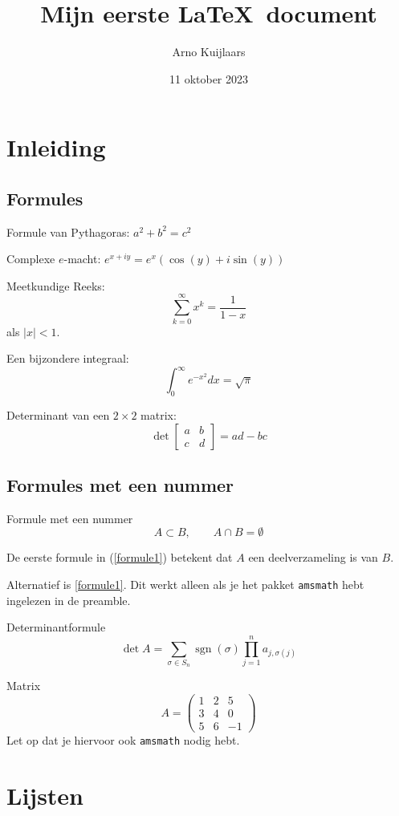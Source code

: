\documentclass[12pt,a4paper]{article}
\title{Mijn eerste \LaTeX\ document}
\author{Arno Kuijlaars}
\date{11 oktober 2023}
\DeclareMathOperator{\sgn}{sgn}
\begin{document}
\maketitle

\section{Inleiding}
\subsection{Formules}

Formule van Pythagoras:  $a^2 + b^2 = c^2$

Complexe $e$-macht: $e^{x+iy} =  e^x (\cos(y) + i \sin(y))$

Meetkundige Reeks:
\[ \sum_{k=0}^{\infty} x^k =  \frac{1}{1-x} \]
 als $|x| < 1$.

 Een bijzondere integraal:
  \[ \int_0^{\infty} e^{-x^2} dx = \sqrt{\pi} \]
  

Determinant van een $2 \times 2$ matrix:
\[ \det \begin{bmatrix} a & b \\ c & d \end{bmatrix} =  ad - bc \]

\subsection{Formules met een nummer}
Formule met een nummer
\begin{equation} \label{formule1}
	   A \subset B,  \qquad A \cap B = \emptyset
\end{equation}

De eerste formule in (\ref{formule1}) 
betekent dat $A$ een deelverzameling  is van $B$.

Alternatief is \eqref{formule1}. Dit werkt alleen als je
het pakket \verb|amsmath| hebt ingelezen in de preamble.

Determinantformule
\[ \det A = \sum_{\sigma \in S_n} \sgn(\sigma) 
	\prod_{j=1}^n a_{j, \sigma(j)} \]

Matrix
\[ A =
  \begin{pmatrix}
	1 & 2 & 5 \\ 3 & 4 & 0 \\ 5 & 6 & -1
	\end{pmatrix}
	\]
Let op dat je hiervoor ook \verb|amsmath| nodig hebt.

\section{Lijsten}
\end{document}
